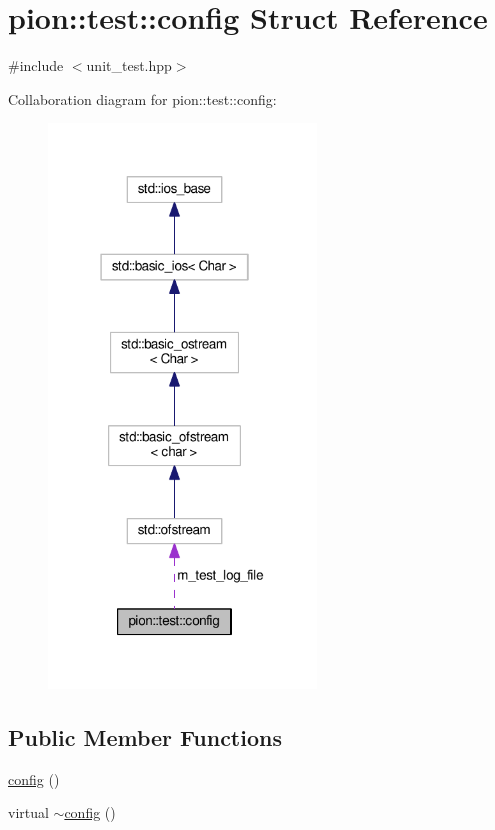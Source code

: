 \hypertarget{structpion_1_1test_1_1config}{\section{pion\-:\-:test\-:\-:config Struct Reference}
\label{structpion_1_1test_1_1config}
}


{\ttfamily \#include $<$unit\-\_\-test.\-hpp$>$}



Collaboration diagram for pion\-:\-:test\-:\-:config\-:
\nopagebreak
\begin{figure}[H]
\begin{center}
\leavevmode
\includegraphics[width=202pt]{structpion_1_1test_1_1config__coll__graph}
\end{center}
\end{figure}
\subsection*{Public Member Functions}
\begin{DoxyCompactItemize}
\item 
\hyperlink{structpion_1_1test_1_1config_a8f6839e7c1e02c5f1a8de31290a0273c}{config} ()
\item 
virtual \hyperlink{structpion_1_1test_1_1config_a7127037d43a5f129ba6994a69308c33c}{$\sim$config} ()
\end{DoxyCompactItemize}
